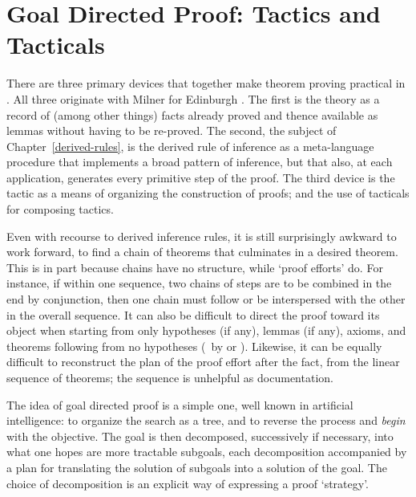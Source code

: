 \chapter{Goal Directed Proof: Tactics and Tacticals}

\label{tactics-and-tacticals}

There are three primary devices that together make theorem proving practical
in \HOL. All three originate with Milner
 for Edinburgh \LCF.
The first is the theory as
a record of (among other things) facts already proved
and thence available as lemmas
without having to be re-proved.  The second,
the subject of Chapter~\ref{derived-rules}, is the
derived rule of inference as a meta-language procedure that implements a
broad pattern of inference, but that also, at each application,
generates every primitive step of the proof. The third device is
the tactic as a means of organizing the construction of proofs;
and the use of tacticals for composing tactics.

Even with recourse to derived inference rules,
it is still surprisingly awkward to work forward,
 to find a chain of
theorems that culminates in a desired theorem.  This is in part because
chains have no structure, while `proof efforts' do.  For instance, if
within one sequence, two chains of steps
are to be combined in the end by conjunction, then
one chain must follow or be interspersed with
the other in the overall sequence.  It can also be difficult to direct
the proof toward its object when starting from
only hypotheses (if any), lemmas (if any),
axioms, and theorems following from no hypotheses
(\eg\ by  or ). Likewise, it can be equally difficult
to reconstruct
the plan of the proof effort after the fact, from the
linear sequence of theorems; the sequence is unhelpful as documentation.

The idea of goal directed proof is a simple one, well known in
artificial intelligence: to organize the search as a tree, and to reverse
the process and {\it begin\/} with the objective. The goal is then
decomposed, successively if necessary,
into what one hopes are more tractable subgoals, each decomposition
accompanied by a
plan for translating the solution of subgoals into a solution of the goal.
The choice of decomposition is an explicit way of expressing a proof
`strategy'.

